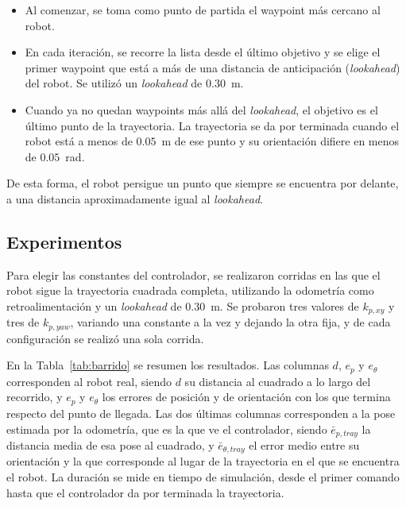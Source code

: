 \documentclass[11pt,a4paper]{article}
\begin{document}
\begin{itemize}
    \item Al comenzar, se toma como punto de partida el waypoint más cercano al robot.
    \item En cada iteración, se recorre la lista desde el último objetivo y se elige el primer waypoint que está a más de una distancia de anticipación (\emph{lookahead}) del robot. Se utilizó un \emph{lookahead} de $0.30$~m.
    \item Cuando ya no quedan waypoints más allá del \emph{lookahead}, el objetivo es el último punto de la trayectoria. La trayectoria se da por terminada cuando el robot está a menos de $0.05$~m de ese punto y su orientación difiere en menos de $0.05$~rad.
\end{itemize}

De esta forma, el robot persigue un punto que siempre se encuentra por delante, a una distancia aproximadamente igual al \emph{lookahead}. 


\subsection{Experimentos}
\label{sec:lazo_exp}
Para elegir las constantes del controlador, se realizaron corridas en las que el robot sigue la trayectoria cuadrada completa, utilizando la odometría como retroalimentación y un \emph{lookahead} de $0.30$~m. Se probaron tres valores de $k_{p,xy}$ y tres de $k_{p,yaw}$, variando una constante a la vez y dejando la otra fija, y de cada configuración se realizó una sola corrida.

En la Tabla~\ref{tab:barrido} se resumen los resultados. Las columnas $d$, $e_p$ y $e_\theta$ corresponden al robot real, siendo $d$ su distancia al cuadrado a lo largo del recorrido, y $e_p$ y $e_\theta$ los errores de posición y de orientación con los que termina respecto del punto de llegada. Las dos últimas columnas corresponden a la pose estimada por la odometría, que es la que ve el controlador, siendo $\bar{e}_{p,tray}$ la distancia media de esa pose al cuadrado, y $\bar{e}_{\theta,tray}$ el error medio entre su orientación y la que corresponde al lugar de la trayectoria en el que se encuentra el robot. La duración se mide en tiempo de simulación, desde el primer comando hasta que el controlador da por terminada la trayectoria.
\end{document}
